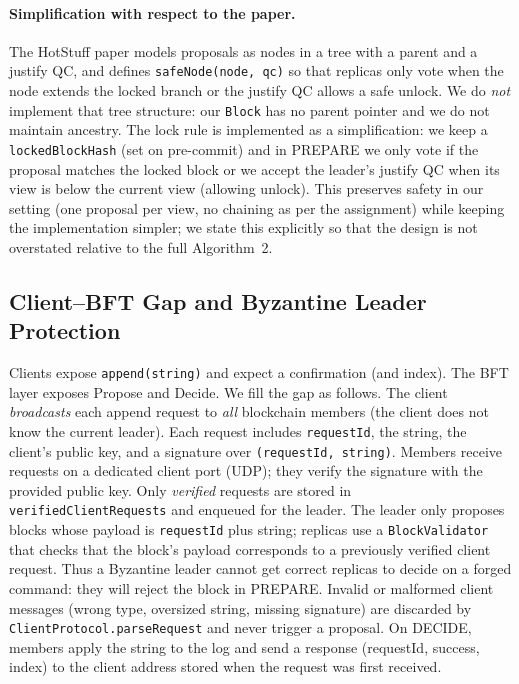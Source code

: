 \documentclass{llncs}
\begin{document}
\paragraph{Simplification with respect to the paper.} The HotStuff paper models proposals as nodes in a tree with a parent and a justify QC, and defines \texttt{safeNode(node, qc)} so that replicas only vote when the node extends the locked branch or the justify QC allows a safe unlock. We do \emph{not} implement that tree structure: our \texttt{Block} has no parent pointer and we do not maintain ancestry. The lock rule is implemented as a simplification: we keep a \texttt{lockedBlockHash} (set on pre-commit) and in PREPARE we only vote if the proposal matches the locked block or we accept the leader's justify QC when its view is below the current view (allowing unlock). This preserves safety in our setting (one proposal per view, no chaining as per the assignment) while keeping the implementation simpler; we state this explicitly so that the design is not overstated relative to the full Algorithm~2.

\subsection{Client--BFT Gap and Byzantine Leader Protection}

Clients expose \texttt{append(string)} and expect a confirmation (and index). The BFT layer exposes Propose and Decide. We fill the gap as follows. The client \emph{broadcasts} each append request to \emph{all} blockchain members (the client does not know the current leader). Each request includes \texttt{requestId}, the string, the client's public key, and a signature over \texttt{(requestId, string)}. Members receive requests on a dedicated client port (UDP); they verify the signature with the provided public key. Only \emph{verified} requests are stored in \texttt{verifiedClientRequests} and enqueued for the leader. The leader only proposes blocks whose payload is \texttt{requestId} plus string; replicas use a \texttt{BlockValidator} that checks that the block's payload corresponds to a previously verified client request. Thus a Byzantine leader cannot get correct replicas to decide on a forged command: they will reject the block in PREPARE. Invalid or malformed client messages (wrong type, oversized string, missing signature) are discarded by \texttt{ClientProtocol.parseRequest} and never trigger a proposal. On DECIDE, members apply the string to the log and send a response (requestId, success, index) to the client address stored when the request was first received.
\end{document}
